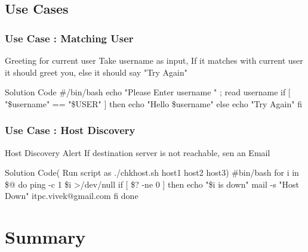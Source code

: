 \documentclass{beamer}
\begin{document}
\subsection{Use Cases}
\begin{frame}\frametitle{ Use Case : Matching User }

\begin{block}{ Greeting for current user }
Take username as input, If it matches with current user it should greet you, else it should say "Try Again"
\end{block}
\begin{exampleblock}{ Solution Code}
\#\!/bin/bash  \newline
echo "Please Enter username " ; read username \newline
if [ "\$username" == "\$USER" ] \newline
then  \newline
echo "Hello \$username" \newline
else \newline
echo "Try Again" \newline
fi

\end{exampleblock}


\end{frame}
\begin{frame}\frametitle{ Use Case : Host Discovery }

\begin{block}{ Host Discovery Alert}
If destination server is not reachable, sen an Email
\end{block}
\begin{exampleblock}{ Solution Code( Run script as ./chkhost.sh host1 host2 host3) }
\#\!bin/bash \newline
for i in \$@ \newline
do \newline
ping -c 1 \$i \textgreater/dev/null \newline
if [ \$? -ne 0 ] \newline
then \newline
echo "\$i is down" \textbar mail -s "Host Down" itpc.vivek@gmail.com \newline
fi \newline
done 
\end{exampleblock}
\end{frame}

\section{ Summary }
\end{document}
